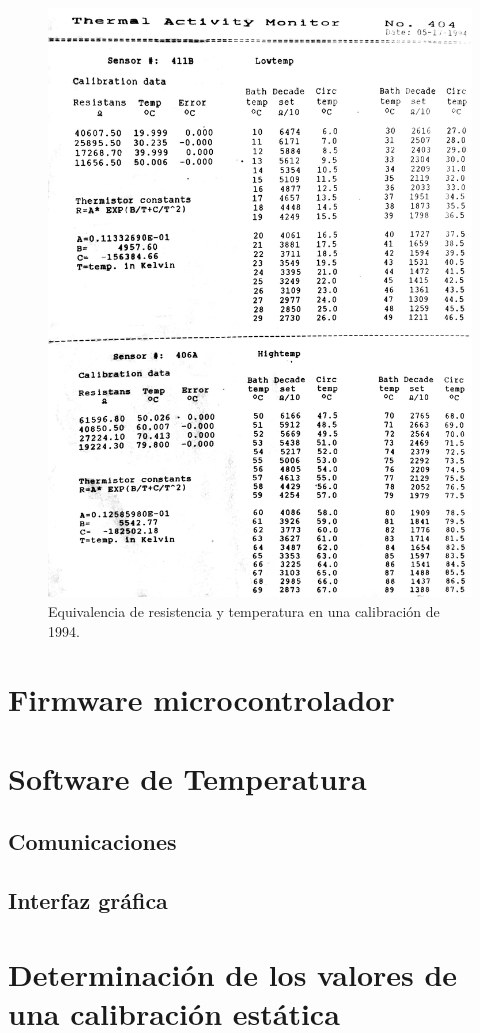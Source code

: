 	\begin{figure}[!h]
		\centering
		\includegraphics[width =\linewidth]{Figures/temperatureTable}
		\caption{Equivalencia de resistencia y temperatura en una calibraci\'on de 1994.}
		\label{fig: temperatureTable}
	\end{figure}

	\section{Firmware microcontrolador}
		
	
	\section{Software de Temperatura}
		\subsection{Comunicaciones}
			
			
		\subsection{Interfaz gr\'afica}
			
			
	\section{Determinación de los valores de una calibración estática}\label{anx: staticCalibration}
		